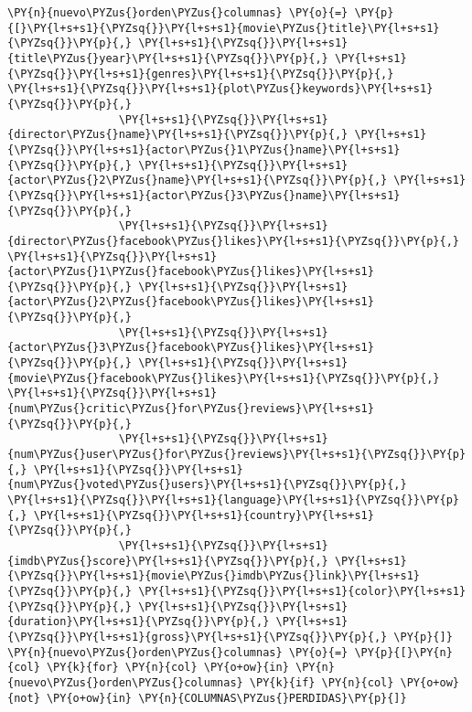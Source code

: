     \begin{tcolorbox}[breakable, size=fbox, boxrule=1pt, pad at break*=1mm,colback=cellbackground, colframe=cellborder]
\begin{Verbatim}[commandchars=\\\{\}]
\PY{n}{nuevo\PYZus{}orden\PYZus{}columnas} \PY{o}{=} \PY{p}{[}\PY{l+s+s1}{\PYZsq{}}\PY{l+s+s1}{movie\PYZus{}title}\PY{l+s+s1}{\PYZsq{}}\PY{p}{,} \PY{l+s+s1}{\PYZsq{}}\PY{l+s+s1}{title\PYZus{}year}\PY{l+s+s1}{\PYZsq{}}\PY{p}{,} \PY{l+s+s1}{\PYZsq{}}\PY{l+s+s1}{genres}\PY{l+s+s1}{\PYZsq{}}\PY{p}{,} \PY{l+s+s1}{\PYZsq{}}\PY{l+s+s1}{plot\PYZus{}keywords}\PY{l+s+s1}{\PYZsq{}}\PY{p}{,} 
                 \PY{l+s+s1}{\PYZsq{}}\PY{l+s+s1}{director\PYZus{}name}\PY{l+s+s1}{\PYZsq{}}\PY{p}{,} \PY{l+s+s1}{\PYZsq{}}\PY{l+s+s1}{actor\PYZus{}1\PYZus{}name}\PY{l+s+s1}{\PYZsq{}}\PY{p}{,} \PY{l+s+s1}{\PYZsq{}}\PY{l+s+s1}{actor\PYZus{}2\PYZus{}name}\PY{l+s+s1}{\PYZsq{}}\PY{p}{,} \PY{l+s+s1}{\PYZsq{}}\PY{l+s+s1}{actor\PYZus{}3\PYZus{}name}\PY{l+s+s1}{\PYZsq{}}\PY{p}{,}
                 \PY{l+s+s1}{\PYZsq{}}\PY{l+s+s1}{director\PYZus{}facebook\PYZus{}likes}\PY{l+s+s1}{\PYZsq{}}\PY{p}{,} \PY{l+s+s1}{\PYZsq{}}\PY{l+s+s1}{actor\PYZus{}1\PYZus{}facebook\PYZus{}likes}\PY{l+s+s1}{\PYZsq{}}\PY{p}{,} \PY{l+s+s1}{\PYZsq{}}\PY{l+s+s1}{actor\PYZus{}2\PYZus{}facebook\PYZus{}likes}\PY{l+s+s1}{\PYZsq{}}\PY{p}{,}
                 \PY{l+s+s1}{\PYZsq{}}\PY{l+s+s1}{actor\PYZus{}3\PYZus{}facebook\PYZus{}likes}\PY{l+s+s1}{\PYZsq{}}\PY{p}{,} \PY{l+s+s1}{\PYZsq{}}\PY{l+s+s1}{movie\PYZus{}facebook\PYZus{}likes}\PY{l+s+s1}{\PYZsq{}}\PY{p}{,} \PY{l+s+s1}{\PYZsq{}}\PY{l+s+s1}{num\PYZus{}critic\PYZus{}for\PYZus{}reviews}\PY{l+s+s1}{\PYZsq{}}\PY{p}{,} 
                 \PY{l+s+s1}{\PYZsq{}}\PY{l+s+s1}{num\PYZus{}user\PYZus{}for\PYZus{}reviews}\PY{l+s+s1}{\PYZsq{}}\PY{p}{,} \PY{l+s+s1}{\PYZsq{}}\PY{l+s+s1}{num\PYZus{}voted\PYZus{}users}\PY{l+s+s1}{\PYZsq{}}\PY{p}{,} \PY{l+s+s1}{\PYZsq{}}\PY{l+s+s1}{language}\PY{l+s+s1}{\PYZsq{}}\PY{p}{,} \PY{l+s+s1}{\PYZsq{}}\PY{l+s+s1}{country}\PY{l+s+s1}{\PYZsq{}}\PY{p}{,}
                 \PY{l+s+s1}{\PYZsq{}}\PY{l+s+s1}{imdb\PYZus{}score}\PY{l+s+s1}{\PYZsq{}}\PY{p}{,} \PY{l+s+s1}{\PYZsq{}}\PY{l+s+s1}{movie\PYZus{}imdb\PYZus{}link}\PY{l+s+s1}{\PYZsq{}}\PY{p}{,} \PY{l+s+s1}{\PYZsq{}}\PY{l+s+s1}{color}\PY{l+s+s1}{\PYZsq{}}\PY{p}{,} \PY{l+s+s1}{\PYZsq{}}\PY{l+s+s1}{duration}\PY{l+s+s1}{\PYZsq{}}\PY{p}{,} \PY{l+s+s1}{\PYZsq{}}\PY{l+s+s1}{gross}\PY{l+s+s1}{\PYZsq{}}\PY{p}{,} \PY{p}{]}
\PY{n}{nuevo\PYZus{}orden\PYZus{}columnas} \PY{o}{=} \PY{p}{[}\PY{n}{col} \PY{k}{for} \PY{n}{col} \PY{o+ow}{in} \PY{n}{nuevo\PYZus{}orden\PYZus{}columnas} \PY{k}{if} \PY{n}{col} \PY{o+ow}{not} \PY{o+ow}{in} \PY{n}{COLUMNAS\PYZus{}PERDIDAS}\PY{p}{]}

\end{Verbatim}
\end{tcolorbox}
